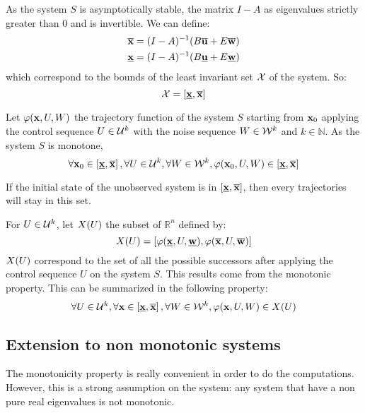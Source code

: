 As the system $S$ is asymptotically stable, the matrix $I-A$ as eigenvalues strictly greater than $0$ and is invertible.
We can define:
\begin{equation}
\begin{split}
\overline{ \mathbf{x}} &= (I-A)^{-1} (B \overline{ \mathbf{u}} + E \overline{ \mathbf{w}})\\
\underline{ \mathbf{x}} &= (I-A)^{-1} (B \underline{ \mathbf{u}} + E \underline{ \mathbf{w}})\\
\end{split}
\end{equation}
which correspond to the bounds of the least invariant set $\mathcal{X}$ of the system.
So:
\begin{equation}
\mathcal{X} = \left[ \underline{ \mathbf{x}}, \overline{ \mathbf{x}} \right]
\end{equation}

Let $\varphi( \mathbf{x},U,W)$ the trajectory function of the system $S$ starting from $ \mathbf{x}_0$
applying the control sequence $U \in {\mathcal{U}}^k$
with the noise sequence $W \in {\mathcal{W}}^k$ and $k \in \mathbb{N}$.
As the system $S$ is monotone,
\begin{equation}
\forall  \mathbf{x}_0 \in \left [\underline{ \mathbf{x}}, \overline{ \mathbf{x}} \right ],
\forall U \in {\mathcal{U}}^k,
\forall W \in {\mathcal{W}}^k,
\varphi ( \mathbf{x}_0,U,W)
\in \left[ \underline{ \mathbf{x}}, \overline{ \mathbf{x}} \right]
\end{equation}

If the initial state of the unobserved system is in $\left[ \underline{ \mathbf{x}}, \overline{ \mathbf{x}} \right]$, then every trajectories will stay in this set.

For $U \in \mathcal{U}^k$, let $X(U)$ the subset of $\mathbb{R}^n$ defined by:
\begin{equation}
X(U) = \left[ 
\varphi (\underline{ \mathbf{x}},U,\underline{ \mathbf{w}}),
\varphi (\overline{ \mathbf{x}},U,\overline{ \mathbf{w}})
\right]
\end{equation}
$X(U)$ correspond to the set of all the possible successors after applying the control sequence $U$ on the system $S$. This results come from the monotonic property.
This can be summarized in the following property:
\begin{equation}
\forall U \in \mathcal{U}^k,
\forall  \mathbf{x} \in \left[\underline{ \mathbf{x}}, \overline{ \mathbf{x}} \right],
\forall W \in \mathcal{W}^k,
\varphi ( \mathbf{x},U,W) \in X(U)
\end{equation}


\subsection{Extension to non monotonic systems}
The monotonicity property is really convenient in order to do the computations.
However, this is a strong assumption on the system: any system that have a non pure real eigenvalues is not monotonic.

